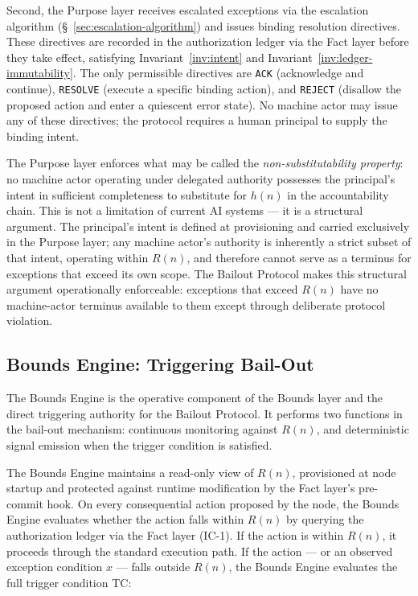 Second, the Purpose layer receives escalated exceptions via the escalation
algorithm (\S~\ref{sec:escalation-algorithm}) and issues binding resolution
directives.  These directives are recorded in the authorization ledger via the
Fact layer before they take effect, satisfying Invariant~\ref{inv:intent} and
Invariant~\ref{inv:ledger-immutability}.  The only permissible directives are
\texttt{ACK} (acknowledge and continue), \texttt{RESOLVE} (execute a specific
binding action), and \texttt{REJECT} (disallow the proposed action and enter
a quiescent error state).  No machine actor may issue any of these directives;
the protocol requires a human principal to supply the binding intent.

The Purpose layer enforces what may be called the \emph{non-substitutability
property}: no machine actor operating under delegated authority possesses the
principal's intent in sufficient completeness to substitute for $h(n)$ in the
accountability chain.  This is not a limitation of current AI systems — it is a
structural argument.  The principal's intent is defined at provisioning and
carried exclusively in the Purpose layer; any machine actor's authority is
inherently a strict subset of that intent, operating within $R(n)$, and
therefore cannot serve as a terminus for exceptions that exceed its own scope.
The Bailout Protocol makes this structural argument operationally enforceable:
exceptions that exceed $R(n)$ have no machine-actor terminus available to them
except through deliberate protocol violation.

\subsection{Bounds Engine: Triggering Bail-Out}\label{sec:bounds-trigger}

The Bounds Engine is the operative component of the Bounds layer and the
direct triggering authority for the Bailout Protocol.  It performs two functions
in the bail-out mechanism: continuous monitoring against $R(n)$, and deterministic
signal emission when the trigger condition is satisfied.

The Bounds Engine maintains a read-only view of $R(n)$, provisioned at node
startup and protected against runtime modification by the Fact layer's
pre-commit hook.  On every consequential action proposed by the node, the
Bounds Engine evaluates whether the action falls within $R(n)$ by querying the
authorization ledger via the Fact layer (IC-1).  If the action is within
$R(n)$, it proceeds through the standard execution path.  If the action — or
an observed exception condition $x$ — falls outside $R(n)$, the Bounds Engine
evaluates the full trigger condition TC:

